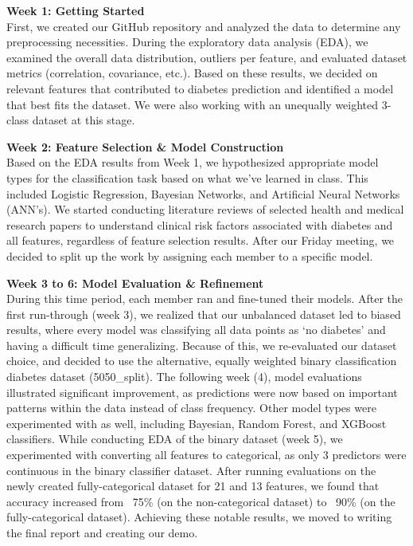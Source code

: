 \documentclass[conference]{IEEEtran}
\begin{document}
\vspace{1em}
\noindent

\noindent \textbf{Week 1: Getting Started}\\
First, we created our GitHub repository and analyzed the data to determine any preprocessing necessities. During the exploratory data analysis (EDA), we examined the overall data distribution, outliers per feature, and evaluated dataset metrics (correlation, covariance, etc.). Based on these results, we decided on relevant features that contributed to diabetes prediction and identified a model that best fits the dataset. We were also working with an unequally weighted 3-class dataset at this stage.

\vspace{1em}

\noindent \textbf{Week 2: Feature Selection \& Model Construction}\\
Based on the EDA results from Week 1, we hypothesized appropriate model types for the classification task based on what we’ve learned in class. This included Logistic Regression, Bayesian Networks, and Artificial Neural Networks (ANN’s). We started conducting literature reviews of selected health and medical research papers to understand clinical risk factors associated with diabetes and all features, regardless of feature selection results. After our Friday meeting, we decided to split up the work by assigning each member to a specific model.

\vspace{1em}

\noindent\textbf{Week 3 to 6: Model Evaluation \& Refinement}\\
During this time period, each member ran and fine-tuned their models. After the first run-through (week 3), we realized that our unbalanced dataset led to biased results, where every model was classifying all data points as ‘no diabetes’ and having a difficult time generalizing. Because of this, we re-evaluated our dataset choice, and decided to use the alternative, equally weighted binary classification diabetes dataset (5050\_split). The following week (4), model evaluations illustrated significant improvement, as predictions were now based on important patterns within the data instead of class frequency. Other model types were experimented with as well, including Bayesian, Random Forest, and XGBoost classifiers. While conducting EDA of the binary dataset (week 5), we experimented with converting all features to categorical, as only 3 predictors were continuous in the binary classifier dataset. After running evaluations on the newly created fully-categorical dataset for 21 and 13 features, we found that accuracy increased from ~75\% (on the non-categorical dataset) to ~90\% (on the fully-categorical dataset). Achieving these notable results, we moved to writing the final report and creating our demo.
\end{document}
